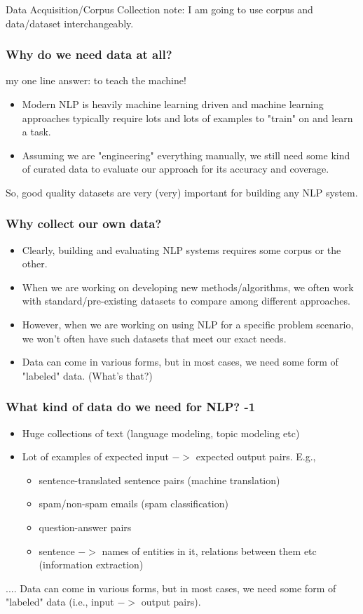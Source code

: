 \documentclass{beamer}
\begin{document}
\begin{frame}
\frametitle{}
\Large Data Acquisition/Corpus Collection
\newline \tiny note: I am going to use corpus and data/dataset interchangeably.
\end{frame}

\begin{frame}
\frametitle{Why do we need data at all?}
my one line answer: to teach the machine! \pause
\begin{itemize}
\item Modern NLP is heavily machine learning driven and machine learning approaches typically require lots and lots of examples to "train" on and learn a task. \pause
\item Assuming we are "engineering" everything manually, we still need some kind of curated data to evaluate our approach for its accuracy and coverage.
\end{itemize}
\pause So, good quality datasets are very (very) important for building any NLP system. 
\end{frame}

\begin{frame}
\frametitle{Why collect our own data?}
\begin{itemize}
\item Clearly, building and evaluating NLP systems requires some corpus or the other.
\item When we are working on developing new methods/algorithms, we often work with standard/pre-existing datasets to compare among different approaches. \pause
\item However, when we are working on using NLP for a specific problem scenario, we won't often have such datasets that meet our exact needs.
\item Data can come in various forms, but in most cases, we need some form of "labeled" data. (What's that?)
\end{itemize}
\end{frame}

\begin{frame}
\frametitle{What kind of data do we need for NLP? -1}
\begin{itemize}
\item Huge collections of text (language modeling, topic modeling etc)  \pause 
\item Lot of examples of expected input $->$ expected output pairs. E.g., 
\begin{itemize}
\item sentence-translated sentence pairs (machine translation)
\item spam/non-spam emails (spam classification)
\item question-answer pairs
\item sentence $->$ names of entities in it, relations between them etc (information extraction)
\end{itemize}
\end{itemize}
.... 
Data can come in various forms, but in most cases, we need some form of "labeled" data (i.e., input $->$ output pairs). 
\end{frame}
\end{document}
